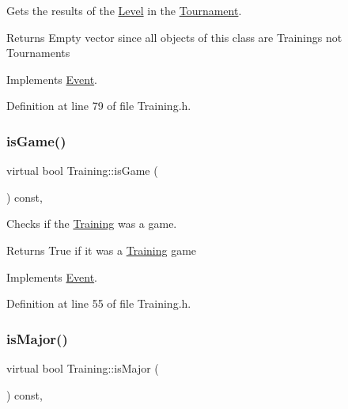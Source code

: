 Gets the results of the \hyperlink{class_level}{Level} in the \hyperlink{class_tournament}{Tournament}. 

\begin{DoxyReturn}{Returns}
Empty vector since all objects of this class are Trainings not Tournaments 
\end{DoxyReturn}


Implements \hyperlink{class_event_a9d29f8c725da32b5fbf70ccf7961f02b}{Event}.



Definition at line 79 of file Training.\+h.

\hypertarget{class_training_a55530cc22aa771cf3e452c7158b5396e}{}\label{class_training_a55530cc22aa771cf3e452c7158b5396e} 
\subsubsection{\texorpdfstring{is\+Game()}{isGame()}}
{\footnotesize\ttfamily virtual bool Training\+::is\+Game (\begin{DoxyParamCaption}{ }\end{DoxyParamCaption}) const\hspace{0.3cm}{\ttfamily [inline]}, {\ttfamily [virtual]}}



Checks if the \hyperlink{class_training}{Training} was a game. 

\begin{DoxyReturn}{Returns}
True if it was a \hyperlink{class_training}{Training} game 
\end{DoxyReturn}


Implements \hyperlink{class_event_add36e9739215f6744040c11de50b26b7}{Event}.



Definition at line 55 of file Training.\+h.

\hypertarget{class_training_aaf1c4d96664a16ca141dd5a3582f9426}{}\label{class_training_aaf1c4d96664a16ca141dd5a3582f9426} 
\subsubsection{\texorpdfstring{is\+Major()}{isMajor()}}
{\footnotesize\ttfamily virtual bool Training\+::is\+Major (\begin{DoxyParamCaption}{ }\end{DoxyParamCaption}) const\hspace{0.3cm}{\ttfamily [inline]}, {\ttfamily [virtual]}}



